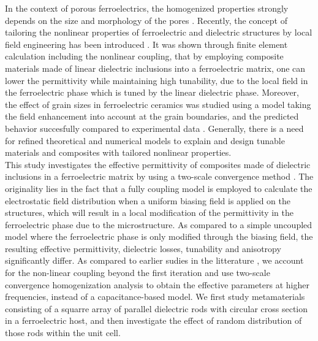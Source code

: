 \documentclass[%
 aip,
 amsmath,amssymb,
 reprint,%
]{revtex4-1}
\begin{document}
  In the context of porous ferroelectrics,
   the homogenized properties strongly depends on the size and morphology of the pores
    \cite{okazaki_effects_1973,stanculescu_study_2015}.
    Recently, the concept of tailoring the nonlinear properties of ferroelectric
     and dielectric structures by local field engineering has been introduced \cite{padurariu_tailoring_2012,padurariu_field-dependent_2012,cazacu_tunable_2013}.
      It was shown through finite element calculation including the nonlinear coupling, that by employing
      composite materials made of linear dielectric inclusions into a ferroelectric matrix, one can lower the permittivity while maintaining
      high tunability, due to the local field in the ferroelectric phase which is tuned by the linear dielectric phase.
Moreover, the effect of grain sizes in ferroelectric
ceramics was studied using a model taking the field enhancement into account at
the grain boundaries, and the predicted behavior succesfully compared to experimental data \cite{padurariu_field-dependent_2012}.
Generally, there is a need for refined theoretical and numerical models to explain and design
tunable materials and composites with tailored nonlinear properties.
\\
This study investigates the effective permittivity of composites made of
 dielectric inclusions in a ferroelectric matrix
by using a two-scale convergence method \cite{allaire_homogenization_1992,
 guenneau_homogenization_2000}.
The originality lies in the fact that a fully coupling model is employed to
calculate the electrostatic field distribution when a uniform biasing field is
applied on the structures, which will result in a local modification of the permittivity
in the ferroelectric phase due to the microstructure. As compared to a simple uncoupled model where the
ferroelectric phase is only modified through the biasing field,
the resulting effective permittivity, dielectric losses, tunability and
anisotropy significantly differ. As compared to earlier sudies in the
litterature \cite{padurariu_tailoring_2012,padurariu_field-dependent_2012}, we account for
the non-linear coupling beyond the first iteration and use two-scale
convergence homogenization analysis to obtain the effective parameters at
higher frequencies, instead of a capacitance-based model.
We first study metamaterials consisting of a squarre array of parallel
dielectric rods with circular cross section in a ferroelectric host, and
then investigate the effect of random distribution of those rods within the unit cell.
\end{document}
